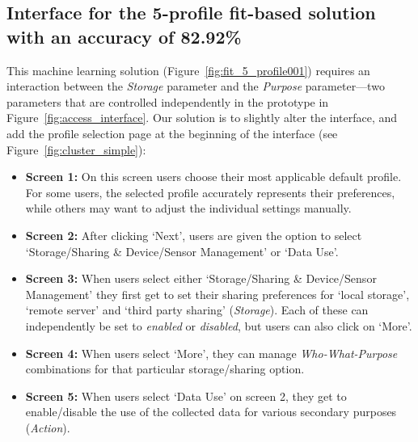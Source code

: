 \subsection{Interface for the 5-profile fit-based solution with an accuracy of 82.92\%}\label{sec:fit_simple}
This machine learning solution (Figure~\ref{fig:fit_5_profile001}) requires an interaction between the \emph{Storage} parameter and the \emph{Purpose} parameter---two parameters that are controlled independently in the prototype in Figure~\ref{fig:access_interface}. Our solution is to slightly alter the interface, and add the profile selection page at the beginning of the interface (see Figure~\ref{fig:cluster_simple}): 
\begin{itemize}
	\item \textbf{Screen 1:} On this screen users choose their most applicable default profile. For some users, the selected profile accurately represents their preferences, while others may want to adjust the individual settings manually.
	\item \textbf{Screen 2:} After clicking `Next', users are given the option to select `Storage/Sharing  \& Device/Sensor Management' or `Data Use'.
	\item \textbf{Screen 3:} When users select either `Storage/Sharing \& Device/Sensor Management' they first get to set their sharing preferences for `local storage', `remote server' and `third party sharing' (\emph{Storage}). Each of these can independently be set to \emph{enabled} or \emph{disabled}, but users can also click on `More'. 
	\item \textbf{Screen 4:} When users select `More', they can manage \emph{Who-What-Purpose} combinations for that particular storage/sharing option.
	\item \textbf{Screen 5:} When users select `Data Use' on screen 2, they get to enable/disable the use of the collected data for various secondary purposes (\emph{Action}). 
\end{itemize}

